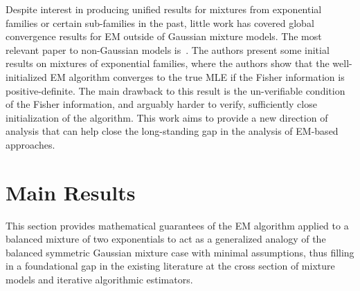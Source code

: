\documentclass[runningheads]{llncs}
\begin{document}
Despite interest in producing unified results for
mixtures from exponential families or certain sub-families in the past, little
work has covered global convergence results for EM outside of Gaussian mixture
models. The most relevant paper to non-Gaussian models
is~\cite{redner1984mixture}. The authors present some initial results on
mixtures of exponential families, where the authors show that the
well-initialized EM algorithm converges to the true MLE if the Fisher
information is positive-definite. The main drawback to this result is the
un-verifiable condition of the Fisher information, and arguably harder to
verify, sufficiently close initialization of the algorithm.
This work aims to provide a new direction of analysis that can help close the
long-standing gap in the analysis of EM-based approaches.


\section{Main Results}\label{sec:results}
This section provides mathematical guarantees of the EM algorithm
applied to a balanced mixture of two exponentials to act as a generalized analogy of
the balanced symmetric Gaussian mixture case with minimal assumptions, thus filling in a
foundational gap in the existing literature at the cross section of mixture
models and iterative algorithmic estimators.
\end{document}
